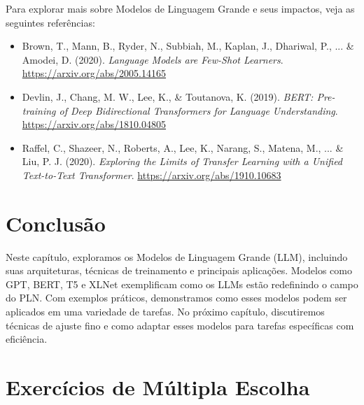 \documentclass[14pt,a4paper,oneside]{book}
\begin{document}
Para explorar mais sobre Modelos de Linguagem Grande e seus impactos, veja as seguintes referências:

\begin{itemize}
	\item Brown, T., Mann, B., Ryder, N., Subbiah, M., Kaplan, J., Dhariwal, P., ... \& Amodei, D. (2020). \textit{Language Models are Few-Shot Learners}. \url{https://arxiv.org/abs/2005.14165}
	\item Devlin, J., Chang, M. W., Lee, K., \& Toutanova, K. (2019). \textit{BERT: Pre-training of Deep Bidirectional Transformers for Language Understanding}. \url{https://arxiv.org/abs/1810.04805}
	\item Raffel, C., Shazeer, N., Roberts, A., Lee, K., Narang, S., Matena, M., ... \& Liu, P. J. (2020). \textit{Exploring the Limits of Transfer Learning with a Unified Text-to-Text Transformer}. \url{https://arxiv.org/abs/1910.10683}
\end{itemize}

\section{Conclusão}

Neste capítulo, exploramos os Modelos de Linguagem Grande (LLM), incluindo suas arquiteturas, técnicas de treinamento e principais aplicações. Modelos como GPT, BERT, T5 e XLNet exemplificam como os LLMs estão redefinindo o campo do PLN. Com exemplos práticos, demonstramos como esses modelos podem ser aplicados em uma variedade de tarefas. No próximo capítulo, discutiremos técnicas de ajuste fino e como adaptar esses modelos para tarefas específicas com eficiência.

\section*{Exercícios de Múltipla Escolha}
\end{document}
